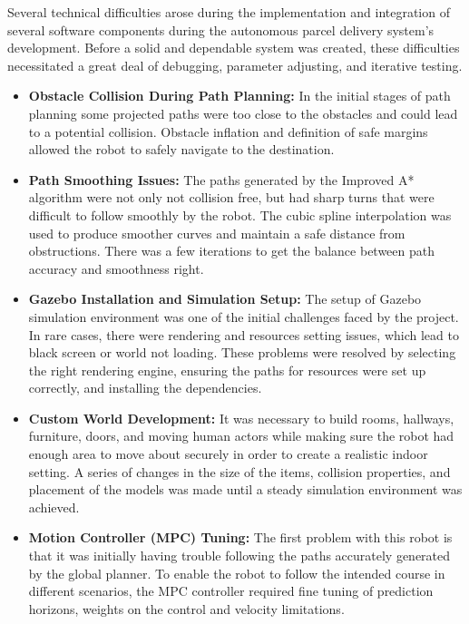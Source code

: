 Several technical difficulties arose during the implementation and integration of several software components during the autonomous parcel delivery system's development. Before a solid and dependable system was created, these difficulties necessitated a great deal of debugging, parameter adjusting, and iterative testing.\begin{itemize}
     \item \textbf{Obstacle Collision During Path Planning:}
	In the initial stages of path planning some projected paths were too close to the obstacles and could lead to a potential collision. Obstacle inflation and definition of safe margins allowed the robot to safely navigate to the destination.


\item \textbf{Path Smoothing Issues:}
The paths generated by the Improved A* algorithm were not only not collision free, but had sharp turns that were difficult to follow smoothly by the robot. The cubic spline interpolation was used to produce smoother curves and maintain a safe distance from obstructions. There was a few iterations to get the balance between path accuracy and smoothness right.

\item \textbf{Gazebo Installation and Simulation Setup:}
The setup of Gazebo simulation environment was one of the initial challenges faced by the project. In rare cases, there were rendering and resources setting issues, which lead to black screen or world not loading. These problems were resolved by selecting the right rendering engine, ensuring the paths for resources were set up correctly, and installing the dependencies.


\item \textbf{Custom World Development:}
It was necessary to build rooms, hallways, furniture, doors, and moving human actors while making sure the robot had enough area to move about securely in order to create a realistic indoor setting. A series of changes in the size of the items, collision properties, and placement of the models was made until a steady simulation environment was achieved.

\item \textbf{Motion Controller (MPC) Tuning:}
The first problem with this robot is that it was initially having trouble following the paths accurately generated by the global planner. To enable the robot to follow the intended course in different scenarios, the MPC controller required fine tuning of prediction horizons, weights on the control and velocity limitations.



\end{itemize}
